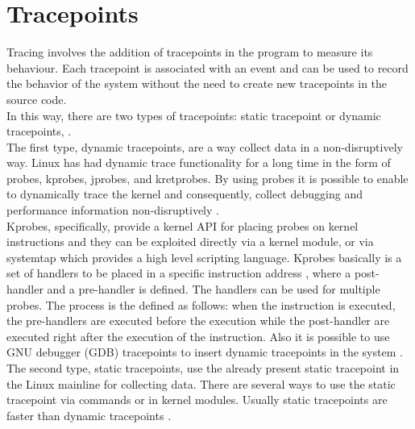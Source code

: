 \section{Tracepoints}
Tracing involves the addition of tracepoints in the program to measure its behaviour.  Each tracepoint is associated with an event and can be used to record the behavior of the system without the need to create new tracepoints in the source code.\\
In this way, there are two types of tracepoints: static tracepoint or dynamic tracepoints, \cite{desnoyers}.\\
The first type, dynamic tracepoints, are a way collect data in a non-disruptively way. Linux has had dynamic trace functionality for a long time in the form of probes, kprobes, jprobes, and kretprobes. By using probes it is possible to enable to dynamically trace the kernel and consequently, collect debugging and performance information non-disruptively \cite{Yanok2015TLV28183022818303}.\\
Kprobes, specifically, provide a kernel API for placing probes on kernel instructions and they can be exploited directly via a kernel module, or via systemtap which provides a high level scripting language. Kprobes basically is a set of handlers to be placed in a specific instruction address \cite{kprobes}, where a post-handler and a pre-handler is defined. The handlers can be used for multiple probes. The process is the defined as follows: when the instruction is executed, the pre-handlers are executed before the execution while the post-handler are executed right after the execution of the instruction. Also it is possible to use GNU debugger (GDB) tracepoints to insert dynamic tracepoints in the system \cite{sucha_tracepoint}. \\
The second type, static tracepoints, use the already present static tracepoint in the Linux mainline for collecting data. There are several ways to use the static tracepoint via commands or in kernel modules.  Usually static tracepoints are faster than dynamic tracepoints \cite{giraldeau-ols2011}.\\

